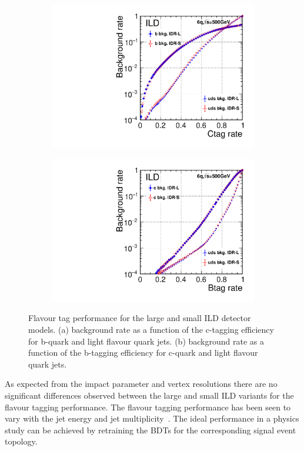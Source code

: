 \begin{figure}[htbp]
\begin{subfigure}{0.49\hsize}
\includegraphics[width=\textwidth]{Performance/fig/ctag_performance.pdf}
 \caption{ \label{fig:HLR-ctag_perf}}
 \end{subfigure}
\begin{subfigure}{0.49\hsize}
\includegraphics[width=\textwidth]{Performance/fig/btag_performance.pdf}
 \caption{  \label{fig:HLR-btag_perf}}
 \end{subfigure}
\caption{Flavour tag performance for the large and small ILD detector models. (a) background rate as a function of the c-tagging efficiency
  for b-quark and light flavour quark jets. (b) background rate as a function of the b-tagging efficiency for c-quark and light flavour quark jets. }
\label{fig:HLR-flavtag}
\end{figure}
%
As expected from the impact parameter and vertex resolutions there are no significant differences observed between the large and small ILD variants
for the flavour tagging performance.
The flavour tagging performance has been seen to vary with the jet energy and jet multiplicity~\cite{Suehara:2015ura}.
The ideal performance in a physics study can be achieved by retraining the BDTs for the corresponding signal event topology.

